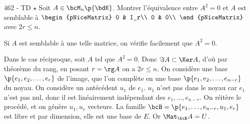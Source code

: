 \documentclass[a4paper,french,bookmarks]{book}
\begin{document}
    \begin{exercise}{462 - TD $\star$}{}
        Soit $A \in \bcM_n\p{\bdK}$. Montrer l'équivalence entre $A^2 = 0$ et
        $A$ est semblable à $\begin{pNiceMatrix}
            0 & I_r\\
            0 & 0\\
        \end{pNiceMatrix}$ avec $2r \leq n$.
        \tcbline
        
        Si $A$ est semblable à une telle matrice, on vérifie facilement que $A^2 = 0$. 
        
        Dans le cas réciproque, soit $A$ tel que $A^2 = 0$. Donc $\Im A \subset \Ker A$, d'où par théorème du rang, en posant $r = \rg A$ on a $2r \leq n$. On considère une base $\p{e_1, e_2, \dots, e_r}$ de l'image, que l'on complète en une base $\p{e_1, e_2, \dots, e_{n-r}}$ du noyau. On considère un antécédent $u_1$ de $e_1$. $u_1$ n'est pas dans le noyau car $e_1$ n'est pas nul, donc il est linéairement indépendant des $e_1, \dots, e_{n-r}$. On réitère le procédé, et on génère $u_1, u_r$ vecteurs. La famille $\bcB = \p{e_1, \dots, e_{n-r}, u_1, e_r}$ est libre et par dimension, elle est une base de $E$. Or $\Mat_\bcB A = U$.
    \end{exercise}
\end{document}
